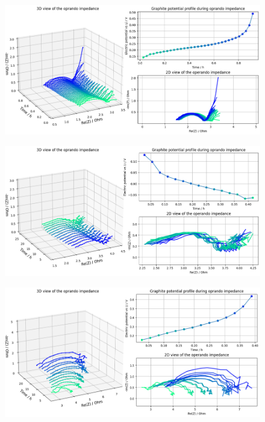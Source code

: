 \begin{figure}[h]
    \centering
    \includegraphics[width=\linewidth]{figures/application5/image4.png}
\end{figure}

\begin{figure}[h]
    \centering
    \includegraphics[width=\linewidth]{figures/application5/image5.png}
\end{figure}

\begin{figure}[h]
    \centering
    \includegraphics[width=\linewidth]{figures/application5/image6.png}
\end{figure}

